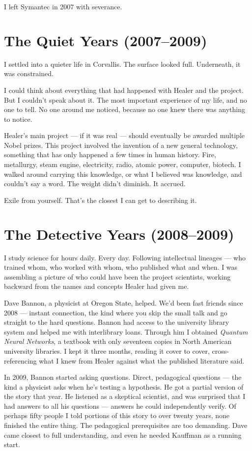 I left Symantec in 2007 with severance.
\section*{The Quiet Years (2007--2009)}
\label{record:ty-the-quiet-years}

I settled into a quieter life in Corvallis. The surface looked full. Underneath, it was constrained.

I could think about everything that had happened with Healer and the project. But I couldn't speak about it. The most important experience of my life, and no one to tell. No one around me noticed, because no one knew there was anything to notice.

Healer's main project --- if it was real --- should eventually be awarded multiple Nobel prizes. This project involved the invention of a new general technology, something that has only happened a few times in human history. Fire, metallurgy, steam engine, electricity, radio, atomic power, computer, biotech. I walked around carrying this knowledge, or what I believed was knowledge, and couldn't say a word. The weight didn't diminish. It accrued.

Exile from yourself. That's the closest I can get to describing it.

\section*{The Detective Years (2008--2009)}
\label{record:ty-the-detective-years}

I study science for hours daily. Every day. Following intellectual lineages --- who trained whom, who worked with whom, who published what and when. I was assembling a picture of who could have been the project scientists, working backward from the names and concepts Healer had given me.

Dave Bannon, a physicist at Oregon State, helped. We'd been fast friends since 2008 --- instant connection, the kind where you skip the small talk and go straight to the hard questions. Bannon had access to the university library system and helped me with interlibrary loans. Through him I obtained \textit{Quantum Neural Networks}, a textbook with only seventeen copies in North American university libraries. I kept it three months, reading it cover to cover, cross-referencing what I knew from Healer against what the published literature said.

In 2009, Bannon started asking questions. Direct, pedagogical questions --- the kind a physicist asks when he's testing a hypothesis. He got a partial version of the story that year. He listened as a skeptical scientist, and was surprised that I had answers to all his questions --- answers he could independently verify. Of perhaps fifty people I told portions of this story to over twenty years, none finished the entire thing. The pedagogical prerequisites are too demanding. Dave came closest to full understanding, and even he needed Kauffman as a running start.

